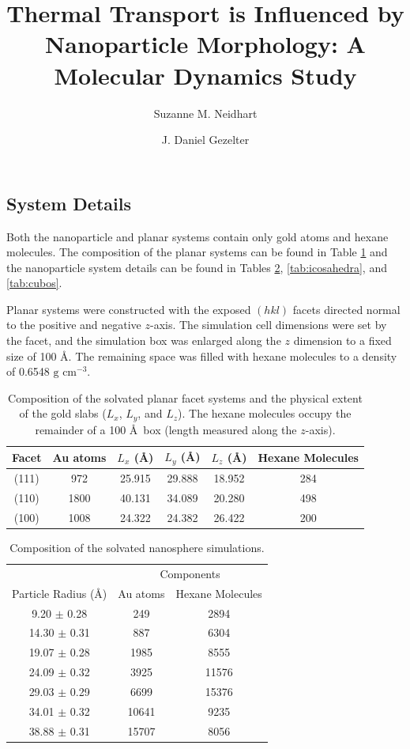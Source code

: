 \documentclass[journal = jpccck, manuscript = suppinfo]{achemso}
\title{Thermal Transport is Influenced by Nanoparticle Morphology: A
  Molecular Dynamics Study}
\author{Suzanne M. Neidhart}
\author{J. Daniel Gezelter}
\affiliation[University of Notre Dame]{251 Nieuwland Science Hall\\ 
Department of Chemistry and Biochemistry\\ 
University of Notre Dame\\ 
Notre Dame, Indiana 46556}
\begin{document}
\subsection{System Details}
Both the nanoparticle and planar systems contain only gold atoms and
hexane molecules.  The composition of the planar systems can be found
in Table \ref{tab:facet} and the nanoparticle system details can be
found in Tables \ref{tab:spheres}, \ref{tab:icosahedra}, and \ref{tab:cubos}.

Planar systems were constructed with the exposed $(hkl)$ facets
directed normal to the positive and negative $z$-axis.  The simulation
cell dimensions were set by the facet, and the simulation box was
enlarged along the $z$ dimension to a fixed size of 100 \AA.  The
remaining space was filled with hexane molecules to a density of
0.6548 $\text{g cm}^{-3}$.

\begin{table}
\centering
\caption{Composition of the solvated planar facet systems and the
  physical extent of the gold slabs ($L_x$, $L_y$, and $L_z$). The
  hexane molecules occupy the remainder of a 100 \AA\ box (length
  measured along the $z$-axis). 
  \label{tab:facet}}
\begin{tabular}{ c|cccc| c }
\toprule
Facet & Au atoms & $L_x$ (\AA) &$L_y$ (\AA) & $L_z$ (\AA) & Hexane Molecules\\
\midrule
(111) &  972 & 25.915	& 29.888 & 18.952 & 284      \\
(110) & 1800 & 40.131	& 34.089 & 20.280 & 498      \\
(100) & 1008 & 24.322	& 24.382 & 26.422 & 200      \\
\bottomrule
\end{tabular}
\end{table}


\begin{table}
\centering
\caption{Composition of the solvated nanosphere simulations.
  \label{tab:spheres}}
\begin{tabular}{ c|cc }
\toprule
        & \multicolumn{2}{c}{Components}\\
Particle Radius (\AA) & Au atoms & Hexane Molecules \\
\midrule
 9.20 $\pm$ 0.28  & 249   &  2894      \\
14.30 $\pm$ 0.31  & 887   &  6304      \\
19.07 $\pm$ 0.28  & 1985  &  8555      \\ 
24.09 $\pm$ 0.32  & 3925  & 11576      \\
29.03 $\pm$ 0.29  & 6699  & 15376      \\
34.01 $\pm$ 0.32  & 10641 &  9235      \\
38.88 $\pm$ 0.31  & 15707 &  8056      \\
\bottomrule
\end{tabular}
\end{table}
\end{document}
